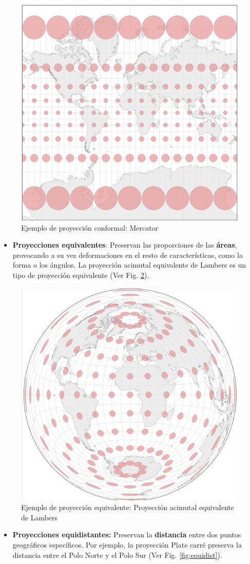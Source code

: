 \documentclass[
]{book}
\providecommand{\tightlist}{%
  \setlength{\itemsep}{0pt}\setlength{\parskip}{0pt}}
\theoremstyle{definition}
\theoremstyle{definition}
\theoremstyle{definition}
\theoremstyle{definition}
\theoremstyle{remark}
\begin{document}
\begin{figure}

{\centering \includegraphics[width=0.3\linewidth]{img/conform} 

}

\caption{Ejemplo de proyección conformal: Mercator}\label{fig:conform}
\end{figure}

\begin{itemize}
\tightlist
\item
  \textbf{Proyecciones equivalentes}: Preservan las proporciones de las \textbf{áreas},
  provocando a su vez deformaciones en el resto de características, como la
  forma o los ángulos. La proyección acimutal equivalente de Lambers es un
  tipo de proyección equivalente (Ver Fig. \ref{fig:equiv}).
\end{itemize}

\begin{figure}

{\centering \includegraphics[width=0.3\linewidth]{img/equiv} 

}

\caption{Ejemplo de proyección equivalente: Proyección acimutal equivalente de Lambers}\label{fig:equiv}
\end{figure}

\begin{itemize}
\tightlist
\item
  \textbf{Proyecciones equidistantes:} Preservan la \textbf{distancia} entre dos puntos
  geográficos específicos. Por ejemplo, la proyección Plate carré preserva la
  distancia entre el Polo Norte y el Polo Sur (Ver Fig. \ref{fig:equidist}).
\end{itemize}
\end{document}

